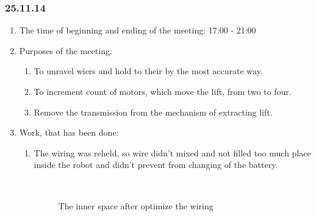 \subsubsection{25.11.14}

\begin{enumerate}
	\item The time of beginning and ending of the meeting:
	17:00 - 21:00
	\item Purposes of the meeting:
	\begin{enumerate}
		\item To unravel wiers and hold to their by the most accurate way.
		
		\item To increment count of motors, which move the lift, from two to four.
		
		\item Remove the transmission from the mechanism of extracting lift.
		
	\end{enumerate}
	\item Work, that has been done:
	\begin{enumerate}
		\item The wiring was reheld, so wire didn't mixed and not filled too much place inside the robot and didn't prevent from changing of the battery.
		
		\begin{figure}[H]
			\begin{minipage}[h]{0.2\linewidth}
				\center  
			\end{minipage}
			\begin{minipage}[h]{0.6\linewidth}
				\caption{The inner space after	optimize the wiring}
			\end{minipage}
		\end{figure}
		

\end{enumerate}
\end{enumerate}
